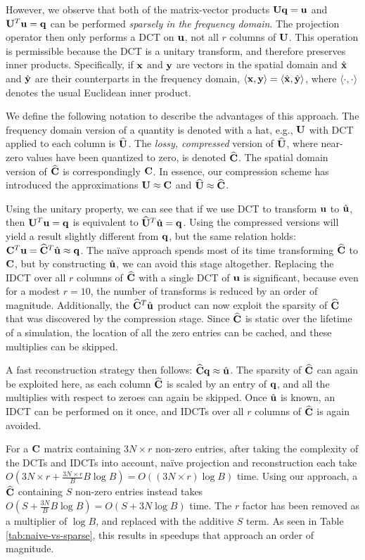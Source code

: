 However, we observe that both of the matrix-vector products $\mathbf{U}\mathbf{q} = \mathbf{u}$ and $\mathbf{U}^T\mathbf{u} = \mathbf{q}$ can be performed {\em sparsely in the frequency domain}. The projection operator then only performs a DCT on $\mathbf{u}$, not all $r$ columns of $\mathbf{U}$. This operation is permissible because the DCT is a unitary transform, and therefore preserves inner products. Specifically, if $\mathbf{x}$ and $\mathbf{y}$ are vectors in the spatial domain and $\hat{\mathbf{x}}$ and $\hat{\mathbf{y}}$ are their counterparts in the frequency domain, $\langle \mathbf{x}, \mathbf{y} \rangle = \langle \hat{\mathbf{x}}, \hat{\mathbf{y}} \rangle$, where $\langle \cdot, \cdot \rangle$ denotes the usual Euclidean inner product.

We define the following notation to describe the advantages of this approach. The frequency domain version of a quantity is denoted with a hat, e.g., $\mathbf{U}$ with DCT applied to each column is $\widehat{\mathbf{U}}$. The {\em lossy, compressed} version of $\widehat{\mathbf{U}}$, where near-zero values have been quantized to zero, is denoted $\widehat{\mathbf{C}}$. The spatial domain version of $\widehat{\mathbf{C}}$ is correspondingly $\mathbf{C}$. In essence, our compression scheme has introduced the approximations $\mathbf{U} \approx \mathbf{C}$ and $\widehat{\mathbf{U}} \approx \widehat{\mathbf{C}}$.


Using the unitary property, we can see that if we use DCT to transform $\mathbf{u}$ to $\hat{\mathbf{u}}$, then $\mathbf{U}^T\mathbf{u} = \mathbf{q}$ is equivalent to $\widehat{\mathbf{U}}^T\hat{\mathbf{u}} = \mathbf{q}$. Using the compressed versions will yield a result slightly different from $\mathbf{q}$, but the same relation holds: $\mathbf{C}^T\mathbf{u} = \widehat{\mathbf{C}}^T\hat{\mathbf{u}} \approx \mathbf{q}$. The na\"{i}ve approach spends most of its time transforming $\widehat{\mathbf{C}}$ to $\mathbf{C}$, but by constructing $\hat{\mathbf{u}}$, we can avoid this stage altogether. Replacing the IDCT over all $r$ columns of $\widehat{\mathbf{C}}$ with a single DCT of $\mathbf{u}$ is significant, because even for a modest $r = 10$, the number of transforms is reduced by an order of magnitude. Additionally, the $\widehat{\mathbf{C}}^T\hat{\mathbf{u}}$ product can now exploit the sparsity of $\widehat{\mathbf{C}}$ that was discovered by the compression stage. Since $\widehat{\mathbf{C}}$ is static over the lifetime of a simulation, the location of all the zero entries can be cached, and these multiplies can be skipped. 

A fast reconstruction strategy then follows: $\widehat{\mathbf{C}}\mathbf{q} \approx \hat{\mathbf{u}}$. The sparsity of $\widehat{\mathbf{C}}$ can again be exploited here, as each column $\widehat{\mathbf{C}}$ is scaled by an entry of $\mathbf{q}$, and all the multiplies with respect to zeroes can again be skipped. Once $\hat{\mathbf{u}}$ is known, an IDCT can be performed on it once, and IDCTs over all $r$ columns of $\widehat{\mathbf{C}}$ is again avoided.

For a $\mathbf{C}$ matrix containing ${3N \times r}$ non-zero entries, after taking the complexity of the DCTs and IDCTs into account, na\"{i}ve projection and reconstruction each take $O\left(3N \times r +\frac{3N \times r}{B} B \log B\right) = O\left((3N \times r)\log B\right)$ time. Using our approach, a $\widehat{\mathbf{C}}$ containing $S$ non-zero entries instead takes $O\left(S + \frac{3N}{B} B \log B\right) = O\left(S + 3N \log B\right)$ time. The $r$ factor has been removed as a multiplier of $\log B$, and replaced with the additive $S$ term. As seen in Table \ref{tab:naive-vs-sparse}, this results in speedups that approach an order of magnitude.

